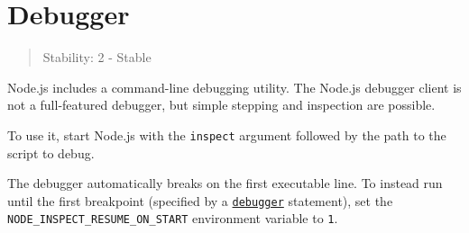 \section{Debugger}\label{debugger}

\begin{quote}
Stability: 2 - Stable
\end{quote}

Node.js includes a command-line debugging utility. The Node.js debugger
client is not a full-featured debugger, but simple stepping and
inspection are possible.

To use it, start Node.js with the \texttt{inspect} argument followed by
the path to the script to debug.

\begin{Shaded}
\begin{Highlighting}[]
\NormalTok{\textless{}}
\NormalTok{\textless{}}
\end{Highlighting}
\end{Shaded}

The debugger automatically breaks on the first executable line. To
instead run until the first breakpoint (specified by a
\href{https://developer.mozilla.org/en-US/docs/Web/JavaScript/Reference/Statements/debugger}{\texttt{debugger}}
statement), set the \texttt{NODE\_INSPECT\_RESUME\_ON\_START}
environment variable to \texttt{1}.

